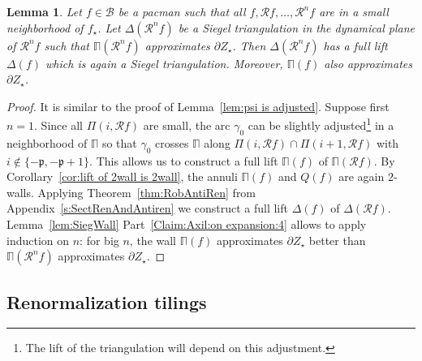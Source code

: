 \documentclass[]{amsart}
\newcommand{\bDelta}{{\mathbb{\Delta}}}
\newcommand{\bPi}{{\mathbb{\Pi}}}
\newcommand\RR{\mathcal{R}}
\newcommand{\str}{{\star}}
\newcommand{\pp}{\mathfrak{p}}
\newcommand\wall{{Q}}
\newcommand\BB{\mathcal{B}}
\newtheorem{lem}[thm]{Lemma}
\theoremstyle{remark}
\numberwithin{equation}{section}
\theoremstyle{definition}
\begin{document}
\begin{lem}
\label{lem:SiegTriangLifting}
Let $f\in \BB$ be a pacman such that all $f,\RR f,\dots, \RR^n f$ are in  a small neighborhood of $f_\str$. Let $\bDelta(\RR^n f)$ be a Siegel triangulation in the dynamical plane of $\RR^n f$ such that $\bPi(\RR^n f)$ approximates $\partial Z_\str$. Then $\bDelta(\RR^n f)$ has a full lift $\bDelta(f)$ which is again a Siegel triangulation. Moreover, $\bPi(f)$ also approximates $\partial Z_\str$.
\end{lem}
\begin{proof}
It is similar to the proof of  Lemma~\ref{lem:psi is adjusted}. Suppose first ${n=1}$. Since all $\Pi(i, \RR f)$ are small, the arc $\gamma_0$ can be slightly adjusted\footnote{The lift of the triangulation will depend on this adjustment.} in a neighborhood of $\bPi$ so that $\gamma_0$ crosses $\bPi$ along $\Pi(i, \RR f)\cap \Pi(i+1, \RR f)$ with $i\not\in \{-\pp,-\pp+1\}$. This allows us to construct a full lift $\bPi(f)$ of $\bPi(\RR f)$. By Corollary~\ref{cor:lift of 2wall is 2wall}, the annuli $\bPi(f)$ and $\wall(f)$ are again $2$-walls. Applying Theorem~\ref{thm:RobAntiRen} from Appendix~\ref{s:SectRenAndAntiren} we construct a full lift $\bDelta(f)$ of $\bDelta(\RR f)$. Lemma~\ref{lem:SiegWall} Part~\eqref{Claim:Axil:on expansion:4} allows to apply induction on $n$: for big $n$, the wall $\bPi(f)$ approximates $\partial Z_\str$ better than $\bPi(\RR^n f)$ approximates $\partial Z_\str$.
\end{proof}


\subsection{Renormalization tilings}
\label{ss:RenTiling}
\end{document}
